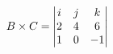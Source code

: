 \documentclass[preview]{standalone}
\begin{document}
\begin{align*}
\special{dvisvgm:raw <g id='unique000'>}B \times C = \begin{vmatrix} i & j & k \\ 2 & 4 & 6 \\ 1 & 0 & -1 \end{vmatrix}\special{dvisvgm:raw </g>}
\end{align*}
\end{document}
